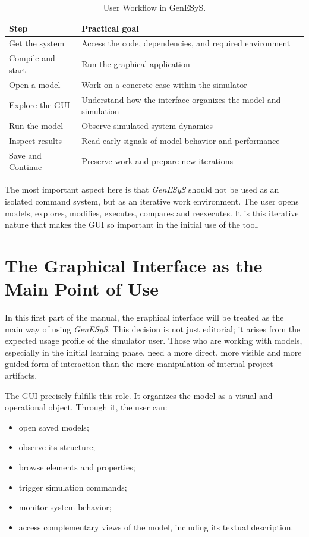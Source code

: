\begin{table}[htbp]
\centering
\caption{User Workflow in GenESyS.}
 \label{tab:cap1_fluxo_usuario}
\small
 \begin{tabular}{|p{3.6cm}|p{7.0cm}|}
\hline
\textbf{Step} & \textbf{Practical goal} \\
\hline
Get the system & Access the code, dependencies, and required environment \\
\hline
Compile and start & Run the graphical application \\
\hline
Open a model & Work on a concrete case within the simulator \\
\hline
Explore the GUI & Understand how the interface organizes the model and simulation \\
\hline
Run the model & Observe simulated system dynamics \\
\hline
Inspect results & Read early signals of model behavior and performance \\
\hline
Save and Continue & Preserve work and prepare new iterations \\
\hline
 \end{tabular}
\end{table}

The most important aspect here is that \textit{GenESyS} should not be used as an isolated command system, but as an iterative work environment. The user opens models, explores, modifies, executes, compares and reexecutes. It is this iterative nature that makes the GUI so important in the initial use of the tool.

\section{The Graphical Interface as the Main Point of Use}
\label{sec:cap1_gui_ponto_principal}

In this first part of the manual, the graphical interface will be treated as the main way of using \textit{GenESyS}. This decision is not just editorial; it arises from the expected usage profile of the simulator user. Those who are working with models, especially in the initial learning phase, need a more direct, more visible and more guided form of interaction than the mere manipulation of internal project artifacts.

The GUI precisely fulfills this role. It organizes the model as a visual and operational object. Through it, the user can:
\begin{itemize}
\item open saved models;
\item observe its structure;
\item browse elements and properties;
\item trigger simulation commands;
\item monitor system behavior;
\item access complementary views of the model, including its textual description.
\end{itemize}

